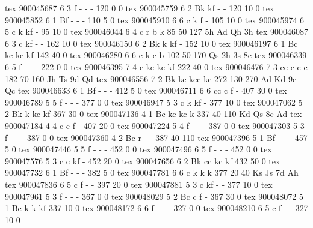 tex       900045687  6  3 f   -     -     -          120    0    0 
tex       900045759  6  2 Bk  kf    -     -          120   10    0 
tex       900045852  6  1 Bf  -     -     -          110    5    0 
tex       900045910  6  6 c   k     f     -          105   10    0 
tex       900045974  6  5 c   k     kf    -           95   10    0 
tex       900046044  6  4 c   r     b     k           85   50  127 5h Ad Qh 3h
tex       900046087  6  3 c   kf    -     -          162   10    0 
tex       900046150  6  2 Bk  k     kf    -          152   10    0 
tex       900046197  6  1 Bc  kc    kc    kf         142   40    0 
tex       900046280  6  6 c   k     c     b          102   50  170 Qs 2h 3s 8c
tex       900046339  6  5 f   -     -     -          222    0    0 
tex       900046395  7  4 c   kc    kc    kf         222   40    0 
tex       900046476  7  3 cc  c     c     c          182   70  160 Jh Ts 9d Qd
tex       900046556  7  2 Bk  kc    kcc   kc         272  130  270 Ad Kd 9c Qc
tex       900046633  6  1 Bf  -     -     -          412    5    0 
tex       900046711  6  6 cc  c     f     -          407   30    0 
tex       900046789  5  5 f   -     -     -          377    0    0 
tex       900046947  5  3 c   k     kf    -          377   10    0 
tex       900047062  5  2 Bk  k     kc    kf         367   30    0 
tex       900047136  4  1 Bc  kc    kc    k          337   40  110 Kd Qs 8c Ad
tex       900047184  4  4 c   c     f     -          407   20    0 
tex       900047224  5  4 f   -     -     -          387    0    0 
tex       900047303  5  3 f   -     -     -          387    0    0 
tex       900047360  4  2 Bc  r     -     -          387   40  110 
tex       900047396  5  1 Bf  -     -     -          457    5    0 
tex       900047446  5  5 f   -     -     -          452    0    0 
tex       900047496  6  5 f   -     -     -          452    0    0 
tex       900047576  5  3 c   c     kf    -          452   20    0 
tex       900047656  6  2 Bk  cc    kc    kf         432   50    0 
tex       900047732  6  1 Bf  -     -     -          382    5    0 
tex       900047781  6  6 c   k     k     k          377   20   40 Ks Js 7d Ah
tex       900047836  6  5 c   f     -     -          397   20    0 
tex       900047881  5  3 c   kf    -     -          377   10    0 
tex       900047961  5  3 f   -     -     -          367    0    0 
tex       900048029  5  2 Bc  c     f     -          367   30    0 
tex       900048072  5  1 Bc  k     k     kf         337   10    0 
tex       900048172  6  6 f   -     -     -          327    0    0 
tex       900048210  6  5 c   f     -     -          327   10    0 
